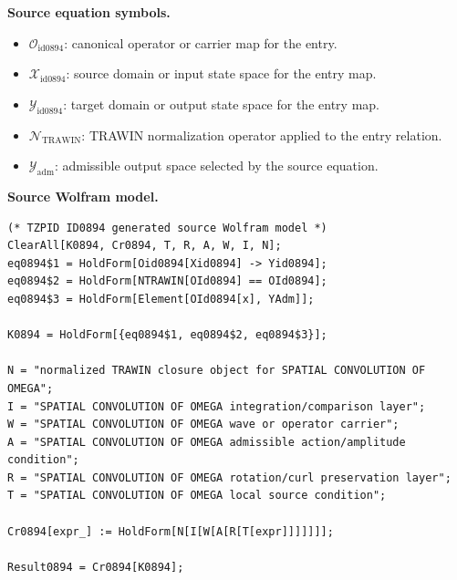 \begin{minipage}[t]{0.49\linewidth}
\begingroup
\small
\raggedright
\textbf{Source equation symbols.}\par
\begin{itemize}[leftmargin=1.35em,itemsep=1pt,topsep=1pt,parsep=0pt]
    \item $\mathcal{O}_{\mathrm{id0894}}$: canonical operator or carrier map for the entry.
    \item $\mathcal{X}_{\mathrm{id0894}}$: source domain or input state space for the entry map.
    \item $\mathcal{Y}_{\mathrm{id0894}}$: target domain or output state space for the entry map.
    \item $\mathcal{N}_{\mathrm{TRAWIN}}$: TRAWIN normalization operator applied to the entry relation.
    \item $\mathcal{Y}_{\mathrm{adm}}$: admissible output space selected by the source equation.
\end{itemize}
\endgroup
\end{minipage}\hfill
\begin{minipage}[t]{0.47\linewidth}
\begingroup
\scriptsize
\raggedright
\textbf{Source Wolfram model.}\par
\begin{Verbatim}[fontsize=\tiny,breaklines=true,breakanywhere=true]
(* TZPID ID0894 generated source Wolfram model *)
ClearAll[K0894, Cr0894, T, R, A, W, I, N];
eq0894$1 = HoldForm[Oid0894[Xid0894] -> Yid0894];
eq0894$2 = HoldForm[NTRAWIN[OId0894] == OId0894];
eq0894$3 = HoldForm[Element[OId0894[x], YAdm]];

K0894 = HoldForm[{eq0894$1, eq0894$2, eq0894$3}];

N = "normalized TRAWIN closure object for SPATIAL CONVOLUTION OF OMEGA";
I = "SPATIAL CONVOLUTION OF OMEGA integration/comparison layer";
W = "SPATIAL CONVOLUTION OF OMEGA wave or operator carrier";
A = "SPATIAL CONVOLUTION OF OMEGA admissible action/amplitude condition";
R = "SPATIAL CONVOLUTION OF OMEGA rotation/curl preservation layer";
T = "SPATIAL CONVOLUTION OF OMEGA local source condition";

Cr0894[expr_] := HoldForm[N[I[W[A[R[T[expr]]]]]]];

Result0894 = Cr0894[K0894];
\end{Verbatim}
\endgroup
\end{minipage}

